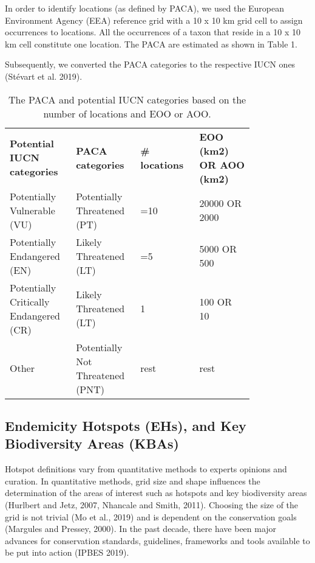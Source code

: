In order to identify locations (as defined by PACA), we used the European
Environment Agency (EEA) reference grid with a 10 x 10 km grid cell to assign
occurrences to locations. All the occurrences of a taxon that reside in a
10 x 10 km cell constitute one location. The PACA are estimated as shown in Table 1.

Subsequently, we converted the PACA categories to the respective IUCN ones (Stévart et al. 2019).

\begin{table}
\centering
\caption{The PACA and potential IUCN categories based on the number of locations and EOO or AOO.}
\begin{tabular}{p{0.2\linewidth} | p{0.2\linewidth} | p{0.2\linewidth} | p{0.2\linewidth}}
\textbf{Potential IUCN categories}     & \textbf{PACA categories}         & \textbf{\# locations} & \textbf{EOO (km2) OR AOO (km2)}  \\
Potentially Vulnerable (VU)            & Potentially Threatened (PT)      & =10                   & 20000 OR 2000                    \\
Potentially Endangered (EN)            & Likely Threatened (LT)           & =5                    & 5000 OR 500                      \\
Potentially Critically Endangered (CR) & Likely Threatened (LT)           & 1                     & 100 OR 10                        \\
Other                                  & Potentially Not Threatened (PNT) & rest                  & rest                            
\end{tabular}
\label{arthropods-paca}
\end{table}
    
    \subsection{Endemicity Hotspots (EHs), and Key Biodiversity Areas (KBAs)}
    \label{subsec:arthropods-ehs-kbas}

Hotspot definitions vary from quantitative methods to experts opinions and curation.
In quantitative methods, grid size and shape influences the determination of
the areas of interest such as hotspots and key biodiversity areas (Hurlbert and Jetz, 2007, Nhancale and Smith, 2011).
Choosing the size of the grid is not trivial (Mo et al., 2019) and is dependent
on the conservation goals (Margules and Pressey, 2000). In the past decade,
there have been major advances for conservation standards, guidelines,
frameworks and tools available to be put into action (IPBES 2019).

